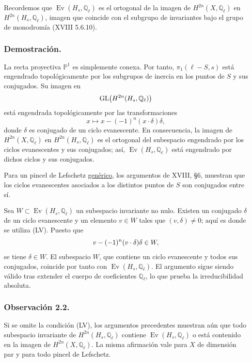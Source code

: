 Recordemos que $\operatorname{Ev}(H_s,\mathbb Q_\ell)$ es el ortogonal
de la imagen de $H^{2n}(X,\mathbb Q_\ell)$ en
$H^{2n}(H_s,\mathbb Q_\ell)$, imagen que coincide con el subgrupo de
invariantes bajo el grupo de monodromía (XVIII 5.6.10).

\pageoriginale

\subsubsection*{Demostración.}

La recta proyectiva $\mathbb P^1$ es simplemente conexa. Por tanto,
$\pi_1(\ell-S,s)$ está engendrado topológicamente por los subgrupos de
inercia en los puntos de $S$ y sus conjugados. Su imagen en
\[
\operatorname{GL}\bigl(
\sisi{H^n(H_s,\mathbb Q_\ell)}{H^{2n}(H_s,\mathbb Q_\ell)}
\bigr)
\]
está engendrada topológicamente por las transformaciones
\[
x\longmapsto x-(-1)^n(x\cdot\delta)\delta,
\]
donde $\delta$ es conjugado de un ciclo evanescente. En consecuencia,
la imagen de $H^{2n}(X,\mathbb Q_\ell)$ en
$H^{2n}(H_s,\mathbb Q_\ell)$ es el ortogonal del subespacio engendrado
por los ciclos evanescentes y sus conjugados; así,
$\operatorname{Ev}(H_s,\mathbb Q_\ell)$ está engendrado por dichos
ciclos y sus conjugados.

Para un pincel de Lefschetz \underline{genérico}, los argumentos de
XVIII, §6, muestran que los ciclos evanescentes asociados a los
distintos puntos de $S$ son conjugados entre sí.

Sea $W\subset\operatorname{Ev}(H_s,\mathbb Q_\ell)$ un subespacio
invariante no nulo. Existen un conjugado $\delta$ de un ciclo
evanescente y un elemento $v\in W$ tales que $(v,\delta)\ne0$; aquí es
donde se utiliza (LV). Puesto que
\[
v-(-1)^{\sisi{m}{n}}(v\cdot\delta)\delta\in W,
\]
se tiene $\delta\in W$. El subespacio $W$, que contiene un ciclo
evanescente y todos sus conjugados, coincide por tanto con
$\operatorname{Ev}(H_s,\mathbb Q_\ell)$. El argumento sigue siendo
válido tras extender el cuerpo de coeficientes $\mathbb Q_\ell$, lo que
prueba la irreducibilidad absoluta.

\subsubsection*{Observación 2.2.}

Si se omite la condición (LV), los argumentos precedentes muestran aún
que todo subespacio invariante de $H^{2n}(H_s,\mathbb Q_\ell)$ contiene
$\operatorname{Ev}(H_s,\mathbb Q_\ell)$ o está contenido en la imagen
de $H^{2n}(X,\mathbb Q_\ell)$. La misma afirmación vale para $X$ de
dimensión par y para todo pincel de Lefschetz.

